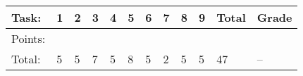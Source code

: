 {\begin{tabular}{llllllllllll}
\hline
 Task:   & 1   & 2   & 3   & 4   & 5   & 6   & 7   & 8   & 9   & Total   & Grade   \\
\hline
 Points: &     &     &     &     &     &     &     &     &     &         &         \\
 Total:  & 5   & 5   & 7   & 5   & 8   & 5   & 2   & 5   & 5   & 47      & --      \\
\hline
\end{tabular}}